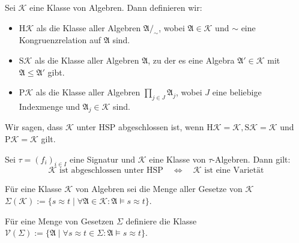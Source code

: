 
\begin{samepage}    
\begin{definition}
    Sei $\mathcal{K}$ eine Klasse von Algebren. Dann definieren wir:
    \begin{itemize}
        \item $\mathrm{H}\mathcal{K}$ als die Klasse aller Algebren $\mathfrak{A /_\sim}$, wobei $\mathfrak{A} \in \mathcal{K}$ und $\sim$ eine Kongruenzrelation auf $\mathfrak{A}$ sind.
        \item $\mathrm{S}\mathcal{K}$ als die Klasse aller Algebren $\mathfrak{A}$, zu der es eine Algebra $\mathfrak{A}' \in \mathcal{K}$ mit $\mathfrak{A} \leq \mathfrak{A}'$ gibt.
        \item $\mathrm{P}\mathcal{K}$ als die Klasse aller Algebren $\prod_{j \in J} \mathfrak{A}_j$, wobei $J$ eine beliebige Indexmenge und $\mathfrak{A}_j \in \mathcal{K}$ sind.
    \end{itemize}
    Wir sagen, dass $\mathcal{K}$ unter $\mathrm{HSP}$ abgeschlossen ist, wenn $\mathrm{H}\mathcal{K} = \mathcal{K}, \mathrm{S}\mathcal{K} = \mathcal{K}$ und $\mathrm{P}\mathcal{K} = \mathcal{K}$ gilt.
\end{definition}
\end{samepage}

\begin{theorem}[Birkhoff]
    Sei $\tau=(f_i)_{i\in I}$ eine Signatur und $\mathcal{K}$ eine Klasse von $\tau$-Algebren. Dann gilt:
    \[\mathcal{K} \text{ ist abgeschlossen unter } \mathrm{HSP} \quad \Leftrightarrow \quad \mathcal{K} \text{ ist eine Varietät} \]
\end{theorem}

\begin{definition}
    Für eine Klasse $\mathcal{K}$ von Algebren sei die Menge aller Gesetze von $\mathcal{K}$ 
    $\Sigma(\mathcal{K}):=\{s\approx t\mid \forall \mathfrak{A}\in\mathcal{K}:\mathfrak{A}\models s\approx t\}$.
    
    Für eine Menge von Gesetzen $\Sigma$ definiere die Klasse $\mathcal{V}(\Sigma):=\{\mathfrak{A}\mid \forall s\approx t\in\Sigma:\mathfrak{A}\models s\approx t\}$.
\end{definition}

